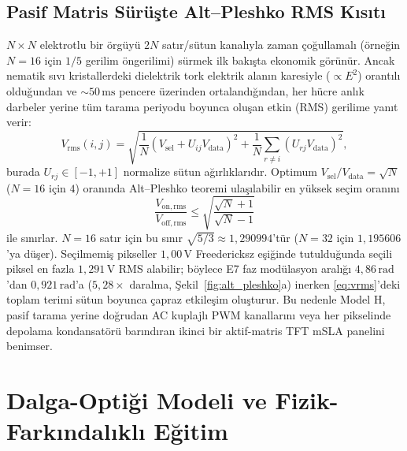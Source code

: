 \documentclass[journal]{IEEEtran}
\begin{document}
\subsection{Pasif Matris S\"ur\"u\c{s}te Alt--Pleshko RMS K\i{}s\i{}t\i{}}
$N\times N$ elektrotlu bir \"org\"uy\"u $2N$ sat\i{}r/s\"utun kanal\i{}yla zaman \c{c}o\u{g}ullamal\i{} (\"orne\u{g}in $N=16$ i\c{c}in $1/5$ gerilim \"ongerilimi) s\"urmek ilk bak\i{}\c{s}ta ekonomik g\"or\"un\"ur. Ancak nematik s\i{}v\i{} kristallerdeki dielektrik tork elektrik alan\i{}n karesiyle ($\propto E^2$) orant\i{}l\i{} oldu\u{g}undan ve $\sim 50\,\text{ms}$ pencere \"uzerinden ortaland\i{}\u{g}\i{}ndan, her h\"ucre anl\i{}k darbeler yerine t\"um tarama periyodu boyunca olu\c{s}an etkin (RMS) gerilime yan\i{}t verir:
\begin{equation}
  V_{\mathrm{rms}}(i,j) = \sqrt{\frac{1}{N}\left(V_{\mathrm{sel}} + U_{ij}V_{\mathrm{data}}\right)^2 + \frac{1}{N}\sum_{r\neq i}\left(U_{rj}V_{\mathrm{data}}\right)^2},
  \label{eq:vrms}
\end{equation}
burada $U_{rj}\in[-1, +1]$ normalize s\"utun a\u{g}\i{}rl\i{}klar\i{}d\i{}r. Optimum $V_{\mathrm{sel}}/V_{\mathrm{data}} = \sqrt{N}$ ($N=16$ i\c{c}in $4$) oran\i{}nda Alt--Pleshko teoremi \cite{alt1974scanning} ula\c{s}\i{}labilir en y\"uksek se\c{c}im oran\i{}n\i{}
\begin{equation}
  \frac{V_{\mathrm{on,rms}}}{V_{\mathrm{off,rms}}} \le \sqrt{\frac{\sqrt{N}+1}{\sqrt{N}-1}}
  \label{eq:alt_pleshko}
\end{equation}
ile s\i{}n\i{}rlar. $N=16$ sat\i{}r i\c{c}in bu s\i{}n\i{}r $\sqrt{5/3} \approx 1{,}290994$'t\"ur ($N=32$ i\c{c}in $1{,}195606$'ya d\"u\c{s}er). Se\c{c}ilmemi\c{s} pikseller $1{,}00\,\text{V}$ Freedericksz e\c{s}i\u{g}inde tutuldu\u{g}unda se\c{c}ili piksel en fazla $1{,}291\,\text{V}$ RMS alabilir; b\"oylece E7 faz mod\"ulasyon aral\i{}\u{g}\i{} $4{,}86\,\text{rad}$'dan $0{,}921\,\text{rad}$'a ($5{,}28\times$ daralma, \c{S}ekil~\ref{fig:alt_pleshko}a) inerken \eqref{eq:vrms}'deki toplam terimi s\"utun boyunca \c{c}apraz etkile\c{s}im olu\c{s}turur. Bu nedenle Model H, pasif tarama yerine do\u{g}rudan AC kuplajl\i{} PWM kanallar\i{}n\i{} veya her pikselinde depolama kondansat\"or\"u bar\i{}nd\i{}ran ikinci bir aktif-matris TFT mSLA panelini benimser.

\section{Dalga-Opti\u{g}i Modeli ve Fizik-Fark\i{}ndal\i{}kl\i{} E\u{g}itim}
\end{document}
